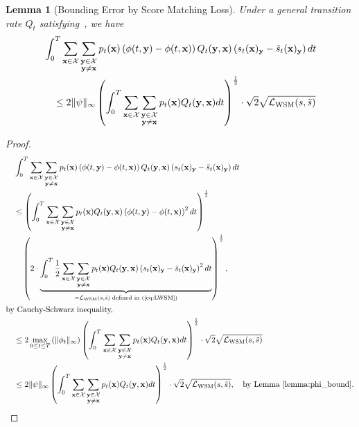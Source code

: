 \documentclass{article} %
\newtheorem{lemma}[theorem]{Lemma}
\def\eqref#1{equation~\ref{#1}}
\newcommand{\bfx}{{\bf x}}
\newcommand{\bfy}{ {\bf y}}
\newcommand{\half}{\frac{1}{2}}
\newcommand{\LWSM}{\mathcal{L}_{\mathrm{WSM}}}
\renewcommand{\eqref}[1]{\textup{(\ref{#1})}}
\begin{document}
\begin{lemma}[Bounding Error by Score Matching Loss]\label{lemma:error_bound_LWSM}
    Under a general transition rate $Q_t$ satisfying~, we have
    \begin{align*}
        & \int_0^T \sum_{\substack{\bfx\in\mathcal{X}}} \sum_{\substack{\bfy\in\mathcal{X} \\ \bfy\neq \bfx}}  p_t(\bfx) \left(\phi(t, \bfy)-\phi(t, \bfx) \right) Q_t(\bfy, \bfx) \left( s_t(\bfx)_\bfy - \tilde{s}_t(\bfx)_\bfy \right)  dt \\ &\quad \leq 2 \| \psi \|_\infty \left(\int_0^T \sum_{\substack{\bfx\in\mathcal{X}}} \sum_{\substack{\bfy\in\mathcal{X} \\\bfy\neq \bfx}} p_t(\bfx)  Q_t(\bfy, \bfx)  dt\right)^{\frac{1}{2}} \cdot \sqrt{2} \sqrt{\LWSM(s, \tilde{s})}
    \end{align*}
\end{lemma}

\begin{proof}
    \begin{align*}
    &\int_0^T \sum_{\substack{\bfx\in\mathcal{X}}} \sum_{\substack{\bfy\in\mathcal{X} \\ \bfy\neq \bfx}}  p_t(\bfx) \left(\phi(t, \bfy)-\phi(t, \bfx) \right) Q_t(\bfy, \bfx) \left( s_t(\bfx)_\bfy - \tilde{s}_t(\bfx)_\bfy \right)  dt \\
    \quad &\leq \left(\int_0^T \sum_{\substack{\bfx\in\mathcal{X}}} \sum_{\substack{\bfy\in\mathcal{X} \\ \bfy\neq \bfx}} p_t(\bfx)  Q_t(\bfy, \bfx) \left(\phi(t, \bfy)-\phi(t, \bfx) \right)^2 dt\right)^{\frac{1}{2}} \\
    &\quad \left( 2 \cdot \underbrace{\int_0^T \half \sum_{\substack{\bfx\in\mathcal{X}}} \sum_{\substack{\bfy\in\mathcal{X} \\ \bfy\neq \bfx}} p_t(\bfx)  Q_t(\bfy, \bfx) \left( s_t(\bfx)_\bfy - \tilde{s}_t(\bfx)_\bfy \right)^2 dt}_{=\LWSM(s, \tilde{s}) \; \text{defined in~\eqref{eq:LWSM}}} \right)^{\frac{1}{2}}, \\
    \intertext{by Cauchy-Schwarz inequality,}
    \quad & \leq 2 \max_{0\leq t\leq T}\left(\| \phi_t\|_\infty \right) \left(\int_0^T \sum_{\substack{\bfx\in\mathcal{X}}} \sum_{\substack{\bfy\in\mathcal{X} \\ \bfy\neq \bfx}} p_t(\bfx)  Q_t(\bfy, \bfx)  dt\right)^{\frac{1}{2}} \cdot \sqrt{2} \sqrt{\LWSM(s, \tilde{s})} \\
    \quad & \leq 2 \| \psi \|_\infty \left(\int_0^T \sum_{\substack{\bfx\in\mathcal{X}}} \sum_{\substack{\bfy\in\mathcal{X} \\\bfy\neq \bfx}} p_t(\bfx)  Q_t(\bfy, \bfx)  dt\right)^{\frac{1}{2}} \cdot \sqrt{2} \sqrt{\LWSM(s, \tilde{s})}, \quad \text{by Lemma~\ref{lemma:phi_bound}}.
\end{align*}
\end{proof}
\end{document}
